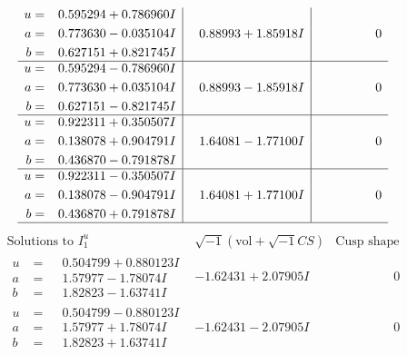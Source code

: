 \documentclass[1p]{elsarticle_modified}
\theoremstyle{definition}
\newcommand{\I}{\sqrt{-1}}
\begin{document}
$$\begin{array}{c|c|c}
\begin{aligned}
u &= \phantom{-}0.595294 + 0.786960 I \\
a &= \phantom{-}0.773630 - 0.035104 I \\
b &= \phantom{-}0.627151 + 0.821745 I\end{aligned}
 & \phantom{-}0.88993 + 1.85918 I & \phantom{-0.000000 } 0 \\ \hline\begin{aligned}
u &= \phantom{-}0.595294 - 0.786960 I \\
a &= \phantom{-}0.773630 + 0.035104 I \\
b &= \phantom{-}0.627151 - 0.821745 I\end{aligned}
 & \phantom{-}0.88993 - 1.85918 I & \phantom{-0.000000 } 0 \\ \hline\begin{aligned}
u &= \phantom{-}0.922311 + 0.350507 I \\
a &= \phantom{-}0.138078 + 0.904791 I \\
b &= \phantom{-}0.436870 - 0.791878 I\end{aligned}
 & \phantom{-}1.64081 - 1.77100 I & \phantom{-0.000000 } 0 \\ \hline\begin{aligned}
u &= \phantom{-}0.922311 - 0.350507 I \\
a &= \phantom{-}0.138078 - 0.904791 I \\
b &= \phantom{-}0.436870 + 0.791878 I\end{aligned}
 & \phantom{-}1.64081 + 1.77100 I & \phantom{-0.000000 } 0\\
 \hline 
 \end{array}$$\newpage$$\begin{array}{c|c|c}  
\text{Solutions to }I^u_{1}& \I (\text{vol} + \sqrt{-1}CS) & \text{Cusp shape}\\
 \hline 
\begin{aligned}
u &= \phantom{-}0.504799 + 0.880123 I \\
a &= \phantom{-}1.57977 - 1.78074 I \\
b &= \phantom{-}1.82823 - 1.63741 I\end{aligned}
 & -1.62431 + 2.07905 I & \phantom{-0.000000 } 0 \\ \hline\begin{aligned}
u &= \phantom{-}0.504799 - 0.880123 I \\
a &= \phantom{-}1.57977 + 1.78074 I \\
b &= \phantom{-}1.82823 + 1.63741 I\end{aligned}
 & -1.62431 - 2.07905 I & \phantom{-0.000000 } 0 \\ \hline\begin{aligned}

\end{aligned}
\end{array}$$
\end{document}
